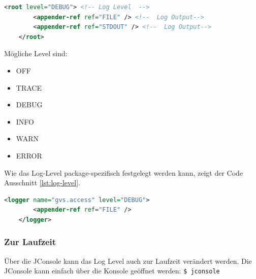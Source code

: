 \documentclass[11pt,a4paper,english,oneside]{book}
\numberwithin{equation}{chapter}
\begin{document}
	\begin{lstlisting}[language=xml, frame=single, caption={Root Log Level verändern}, label={lst:root-log-level}]
	<root level="DEBUG"> <!-- Log Level  -->
		<appender-ref ref="FILE" /> <!--  Log Output-->
		<appender-ref ref="STDOUT" /> <!--  Log Output-->
	</root>
	\end{lstlisting}
	
	Mögliche Level sind:
	\begin{itemize}
		\item OFF
		\item TRACE
		\item DEBUG
		\item INFO
		\item WARN
		\item ERROR
	\end{itemize}

	Wie das Log-Level package-spezifisch festgelegt werden kann, zeigt der Code Ausschnitt \ref{lst:log-level}.
	
	\begin{lstlisting}[language=xml, frame=single, caption={Root Log Level verändern}, label={lst:log-level}]
	<logger name="gvs.access" level="DEBUG">
		<appender-ref ref="FILE" />
	</logger>
	\end{lstlisting}	

	\subsubsection{Zur Laufzeit}
	Über die JConsole kann das Log Level auch zur Laufzeit verändert werden. Die JConsole kann einfach über die Konsole geöffnet werden: \lstinline{$ jconsole}
	
\end{document}
